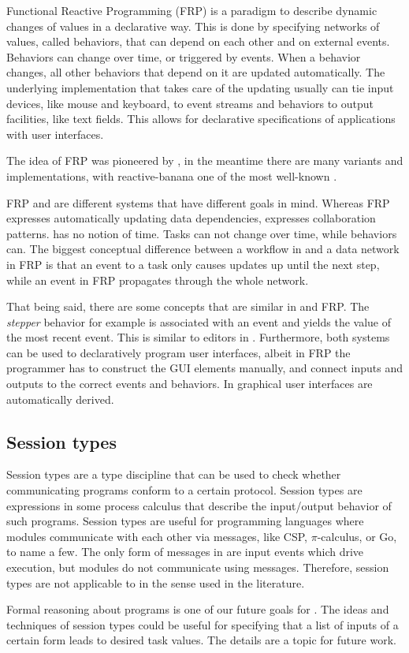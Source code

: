 Functional Reactive Programming (FRP) is a paradigm to describe dynamic changes of values in a declarative way.
This is done by specifying networks of values, called behaviors, that can depend on each other and on external events.
Behaviors can change over time, or triggered by events.
When a behavior changes, all other behaviors that depend on it are updated automatically.
The underlying implementation that takes care of the updating usually can tie input devices, like mouse and keyboard, to event streams and behaviors to output facilities, like text fields.
This allows for declarative specifications of applications with user interfaces.

The idea of FRP was pioneered by \citet{conf/icfp/ElliottH97}, in the meantime there are many variants and implementations, with reactive-banana one of the most well-known \cite{reactive-banana}.

FRP and \TOP are different systems that have different goals in mind.
Whereas FRP expresses automatically updating data dependencies, \TOP expresses collaboration patterns.
\TOP has no notion of time.
Tasks can not change over time, while behaviors can.
The biggest conceptual difference between a workflow in \TOP and a data network in FRP is that an event to a task only causes updates up until the next step, while an event in FRP propagates through the whole network.

That being said, there are some concepts that are similar in \TOP and FRP.
The \emph{stepper} behavior for example is associated with an event and yields the value of the most recent event.
This is similar to editors in \TOP.
Furthermore, both systems can be used to declaratively program user interfaces, albeit in FRP the programmer has to construct the GUI elements manually, and connect inputs and outputs to the correct events and behaviors.
In \TOP graphical user interfaces are automatically derived.


\subsection{Session types}

Session types are a type discipline that can be used to check whether communicating programs conform to a certain protocol.
Session types are expressions in some process calculus that describe the input/output behavior of such programs.
Session types are useful for programming languages where modules communicate with each other via messages, like CSP, $\pi$-calculus, or Go, to name a few.
The only form of messages in \TOP are input events which drive execution, but modules do not communicate using messages.
Therefore, session types are not applicable to \TOP in the sense used in the literature.

Formal reasoning about \TOP programs is one of our future goals for \TOPHAT.
The ideas and techniques of session types could be useful for specifying that a list of inputs of a certain form leads to desired task values.
The details are a topic for future work.
